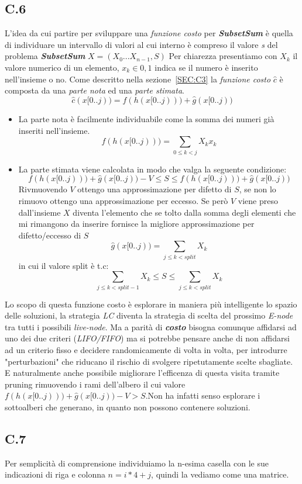 \documentclass[a4paper]{article}
\newcommand{\imp}[1]{\textbf{\textit{#1}}}
\begin{document}
\subsection{C.6}
\label{SEC:C6}
L'idea da cui partire per sviluppare una \textit{funzione costo} per \imp{SubsetSum} è quella di individuare un intervallo di valori al cui interno è compreso il valore \emph{s} del problema \imp{SubsetSum} $X =({X_0 ... X_{n-1}},S)$ 
Per chiarezza presentiamo con $X_k$ il valore numerico di un elemento, $x_k \in {0,1}$ indica se il numero è inserito nell'insieme o no.
Come descritto nella sezione~\ref{SEC:C3} la \textit{funzione costo} $\hat c$ è composta da una \textit{parte nota} ed una \textit{parte stimata}.
$$\hat c(x[0..j)) = f(h(x[0..j))) + \hat g(x[0..j))$$
\begin{itemize}
	\item La parte nota è facilmente individuabile come la somma dei numeri già inseriti nell'insieme.$$ f(h(x[0..j)))=\sum_{0 \leq k < j} X_kx_k$$
	\item La parte stimata viene calcolata in modo che valga la seguente condizione:
		$$ f(h(x[0..j))) + \hat g(x[0..j)) - V \leq S \leq f(h(x[0..j))) + \hat g(x[0..j)) $$
	Rivmuovendo $V$ ottengo una approssimazione per difetto di $S$, se non lo rimuovo ottengo una approssimazione per eccesso.
	Se però $V$ viene preso dall'insieme $X$ diventa l'elemento che se tolto dalla somma degli elementi che mi rimangono da inserire fornisce la migliore approssimazione per difetto/eccesso di $S$
	$$ \hat g(x[0..j))=\sum_{j \leq k < split} X_k$$ in cui il valore split è t.c:
	$$\sum_{j \leq k < split-1} X_k \leq S \leq \sum_{j \leq k < split} X_k$$
\end{itemize}
Lo scopo di questa funzione costo è esplorare in maniera più intelligente lo spazio delle soluzioni, la strategia \textit{LC} diventa la strategia di scelta del prossimo \textit{E-node} tra tutti i possibili \textit{live-node}.
Ma a parità di \imp{costo} bisogna comunque affidarsi ad uno dei due criteri (\textit{LIFO/FIFO}) ma si potrebbe pensare anche di non affidarsi ad un criterio fisso e decidere randomicamente di volta in volta, per introdurre "perturbazioni" che riducano il rischio di svolgere ripetutamente scelte sbagliate.
E naturalmente anche possibile migliorare l'efficenza di questa visita tramite pruning rimuovendo i rami dell'albero il cui valore $ f(h(x[0..j))) + \hat g(x[0..j)) - V > S$.Non ha infatti senso esplorare i sottoalberi che generano, in quanto non possono contenere soluzioni.
\subsection{C.7}
Per semplicità di comprensione individuiamo la n-esima casella con le sue indicazioni di riga e colonna $n = i*4 + j$, quindi la vediamo come una matrice.
\end{document}
